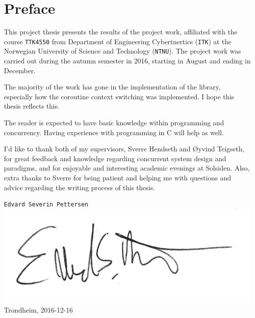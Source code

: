 
\newpage
{}
\section*{Preface}

This project thesis presents the results of the project work, affiliated with the course \texttt{TTK4550} from Department of Engineering Cybertnertics (\texttt{ITK}) at the Norwegian University of Science and Technology (\texttt{NTNU}). The project work was carried out during the autumn semester in 2016, starting in August and ending in December.

The majority of the work has gone in the implementation of the library, especially how the coroutine context switching was implemented. I hope this thesis reflects this.

The reader is expected to have basic knowledge within programming and concurrency. Having experience with programming in C will help as well.

I'd like to thank both of my supervisors, Sverre Hendseth and Øyvind Teigseth, for great feedback and knowledge regarding concurrent system design and paradigms, and for enjoyable and interesting academic evenings at Solsiden. Also, extra thanks to Sverre for being patient and helping me with questions and advice regarding the writing process of this thesis.\\[2cm]

\begin{flushright}
\texttt{Edvard Severin Pettersen}\\
\includegraphics[width=0.3\linewidth,right]{fig/signature}
Trondheim, 2016-12-16
\end{flushright}

\afterpage{\blankpage}
